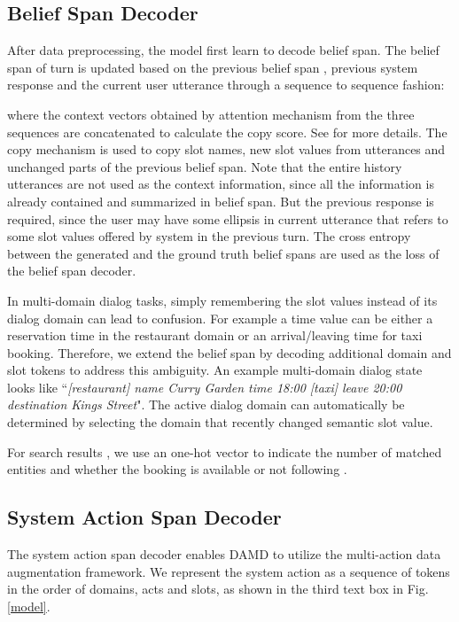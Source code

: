 \documentclass[letterpaper]{article} \usepackage{aaai20}  \usepackage{times}  \usepackage{helvet} \usepackage{courier}  \usepackage[hyphens]{url}  \usepackage{graphicx} \urlstyle{rm} \def\UrlFont{\rm}  \usepackage{graphicx}  \frenchspacing  \setlength{\pdfpagewidth}{8.5in}  \setlength{\pdfpageheight}{11in}  \usepackage{multirow}
\begin{document}
	
	\subsection{Belief Span Decoder}
	After data preprocessing, the model first learn to  decode belief span.
	The belief span  of turn  is updated based on the previous belief span , previous system response  and the current user utterance  through a sequence to sequence fashion:
	
	where the context vectors obtained by attention mechanism from the three sequences are concatenated to calculate the copy score. See \citeauthor{lei2018sequicity}  for more details. The copy mechanism is used to copy slot names, new slot values from utterances and unchanged parts of the previous belief span. Note that the entire history utterances are not used as the context information, since all the information is already contained and summarized in belief span. But the previous response is required, since the user may have some ellipsis in current utterance that refers to some slot values offered by system in the previous turn. The cross entropy between the generated and the ground truth belief spans are used as the loss of the belief span decoder. 
	
	In multi-domain dialog tasks, simply remembering the slot values instead of its dialog domain can lead to confusion. For example a time value can be either a reservation time in the restaurant domain or an arrival/leaving time for taxi booking. Therefore, we extend the belief span by decoding additional domain and slot tokens to address this ambiguity. An example multi-domain dialog state looks like ``\textit{{[restaurant]} name Curry Garden time 18:00 {[taxi]} leave 20:00 destination Kings Street}". The active dialog domain can automatically be determined by selecting the domain that recently changed semantic slot value. 
	
For search results , we use an one-hot vector to indicate the number of matched entities and whether the booking is available or not following \citeauthor{budzianowski2018multiwoz} . 
	
	
	\subsection{System Action Span Decoder}
	The system action span decoder enables DAMD to utilize the multi-action data augmentation framework. We represent the system action as a sequence of tokens in the order of domains, acts and slots, as shown in the third text box in Fig. \ref{model}. 
	
\end{document}

